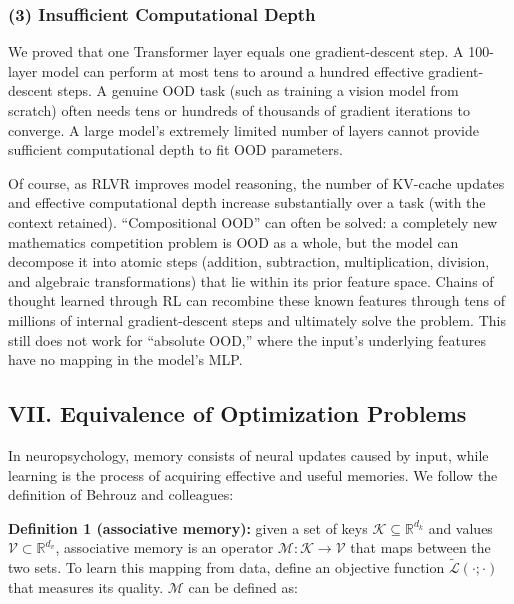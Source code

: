\hypertarget{insufficient-computational-depth}{%
\subsubsection{(3) Insufficient Computational Depth}\label{insufficient-computational-depth}}

We proved that one Transformer layer equals one gradient-descent step. A 100-layer model can perform at most tens to around a hundred effective gradient-descent steps. A genuine OOD task (such as training a vision model from scratch) often needs tens or hundreds of thousands of gradient iterations to converge. A large model's extremely limited number of layers cannot provide sufficient computational depth to fit OOD parameters.

Of course, as RLVR improves model reasoning, the number of KV-cache updates and effective computational depth increase substantially over a task (with the context retained). ``Compositional OOD'' can often be solved: a completely new mathematics competition problem is OOD as a whole, but the model can decompose it into atomic steps (addition, subtraction, multiplication, division, and algebraic transformations) that lie within its prior feature space. Chains of thought learned through RL can recombine these known features through tens of millions of internal gradient-descent steps and ultimately solve the problem. This still does not work for ``absolute OOD,'' where the input's underlying features have no mapping in the model's MLP.

\hypertarget{vii.-equivalence-of-optimization-problems}{%
\subsection{VII. Equivalence of Optimization Problems}\label{vii.-equivalence-of-optimization-problems}}

In neuropsychology, memory consists of neural updates caused by input, while learning is the process of acquiring effective and useful memories. We follow the definition of Behrouz and colleagues:

\textbf{Definition 1 (associative memory):} given a set of keys \(\mathcal{K}\subseteq\mathbb{R}^{d_k}\) and values \(\mathcal{V}\subset\mathbb{R}^{d_v}\), associative memory is an operator \(\mathcal{M}:\mathcal{K}\to\mathcal{V}\) that maps between the two sets. To learn this mapping from data, define an objective function \(\tilde{\mathcal{L}}(\cdot;\cdot)\) that measures its quality. \(\mathcal{M}\) can be defined as:

